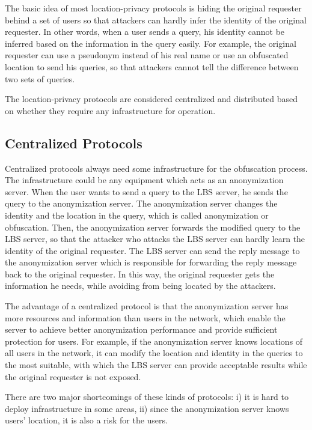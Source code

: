\noindent The basic idea of most location-privacy protocols is hiding the original requester behind a set of users so that attackers can hardly infer the identity of the original requester. In other words, when a user sends a query, his identity cannot be inferred based on the information in the query easily. For example, the original requester can use a pseudonym instead of his real name or use an obfuscated location to send his queries, so that attackers cannot tell the difference between two sets of queries. 

The location-privacy protocols are considered centralized and distributed based on whether they require any infrastructure for operation. 


\subsection{ Centralized Protocols}

\noindent Centralized protocols always need some infrastructure for the obfuscation process. The infrastructure could be any equipment which acts as an anonymization server. When the user wants to send a query to the LBS server, he sends the query to the anonymization server. The anonymization server changes the identity and the location in the query, which is called anonymization or obfuscation. Then, the anonymization server forwards the modified query to the LBS server, so that the attacker who attacks the LBS server can hardly learn the identity of the original requester. The LBS server can send the reply message to the anonymization server which is responsible for forwarding the reply message back to the original requester. In this way, the original requester gets the information he needs, while avoiding from being located by the attackers.

The advantage of a centralized protocol is that the anonymization server has more resources and information than users in the network, which enable the server to achieve better anonymization performance and provide sufficient protection for users. For example, if the anonymization server knows locations of all users in the network, it can modify the location and identity in the queries to the most suitable, with which the LBS server can provide acceptable results while the original requester is not exposed.

There are two major shortcomings of these kinds of protocols: i) it is hard to deploy infrastructure in some areas, ii) since the anonymization server knows users' location, it is also a risk for the users.


